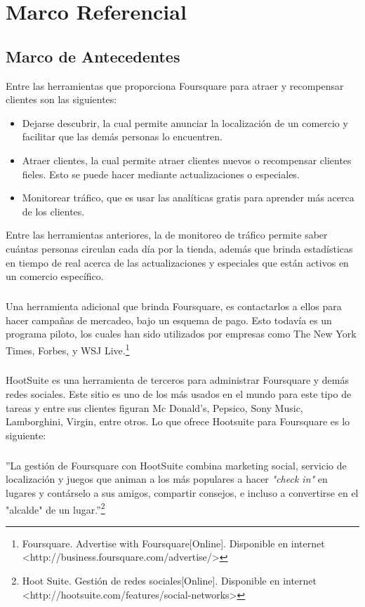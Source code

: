 \chapter{Marco Referencial}
\label{sec:marco}

\section{Marco de Antecedentes}
Entre las herramientas que proporciona Foursquare para atraer y recompensar clientes son las siguientes:
\begin{itemize}
\item Dejarse descubrir, la cual permite anunciar la localizaci\'on de un comercio y facilitar que las dem\'as personas lo encuentren.
\item Atraer clientes, la cual permite atraer clientes nuevos o recompensar clientes fieles. Esto se puede hacer mediante actualizaciones o especiales.
\item Monitorear tr\'afico, que es usar las anal\'iticas gratis para aprender m\'as acerca de los clientes.
\end{itemize}
Entre las herramientas anteriores, la de monitoreo de tr\'afico permite saber cu\'antas personas circulan cada d\'ia por la tienda, adem\'as que brinda estad\'isticas en tiempo de real acerca de  las actualizaciones y especiales que est\'an activos en un comercio espec\'ifico.
\paragraph{}
Una herramienta adicional que brinda Foursquare, es contactarlos a ellos para hacer campa\~nas de mercadeo, bajo un esquema de pago. Esto todav\'ia es un programa piloto, los cuales han sido utilizados por empresas como The New York Times, Forbes, y WSJ Live.\footnote{Foursquare. Advertise with Foursquare[Online]. Disponible en internet \textless http://business.foursquare.com/advertise/\textgreater}
\paragraph{}
HootSuite es una herramienta de terceros para administrar Foursquare y dem\'as redes sociales. Este sitio es uno de los m\'as usados en el mundo para este tipo de tareas y entre sus clientes figuran Mc Donald’s, Pepsico, Sony Music, Lamborghini, Virgin, entre otros. Lo que ofrece Hootsuite para Foursquare es lo siguiente:
\paragraph{}
''La gesti\'on de Foursquare con HootSuite combina marketing social, servicio de localizaci\'on y juegos que animan a los m\'as populares a hacer \textit{"check in"} en lugares y cont\'arselo a sus amigos, compartir consejos, e incluso a convertirse en el "alcalde" de un lugar.''\footnote{Hoot Suite. Gesti\'on de redes sociales[Online]. Disponible en internet \textless http://hootsuite.com/features/social-networks\textgreater}

